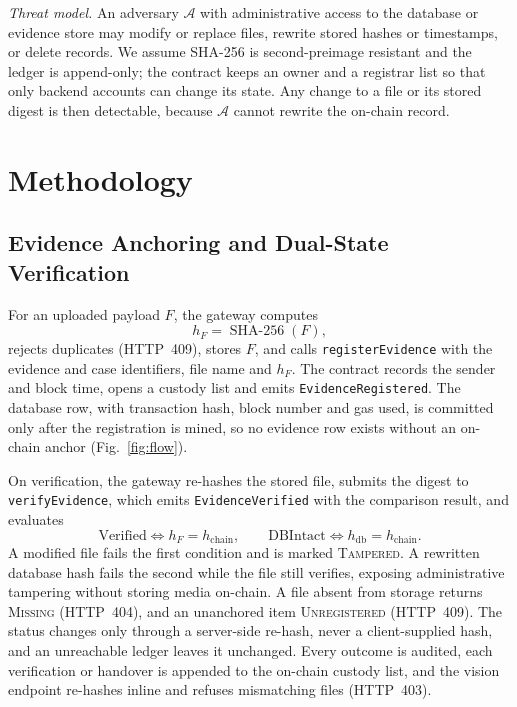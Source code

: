 \documentclass[conference]{IEEEtran}
\begin{document}
\textit{Threat model.} An adversary $\mathcal{A}$ with administrative access to the database or evidence store may modify or replace files, rewrite stored hashes or timestamps, or delete records. We assume SHA-256 is second-preimage resistant and the ledger is append-only; the contract keeps an owner and a registrar list so that only backend accounts can change its state. Any change to a file or its stored digest is then detectable, because $\mathcal{A}$ cannot rewrite the on-chain record.

\section{Methodology}
\label{sec:method}

\subsection{Evidence Anchoring and Dual-State Verification}
\label{subsec:anchoring}

For an uploaded payload $F$, the gateway computes
\begin{equation}
h_F=\operatorname{SHA\text{-}256}(F),
\label{eq:sha}
\end{equation}
rejects duplicates (HTTP~409), stores $F$, and calls \texttt{registerEvidence} with the evidence and case identifiers, file name and $h_F$. The contract records the sender and block time, opens a custody list and emits \texttt{EvidenceRegistered}. The database row, with transaction hash, block number and gas used, is committed only after the registration is mined, so no evidence row exists without an on-chain anchor (Fig.~\ref{fig:flow}).

On verification, the gateway re-hashes the stored file, submits the digest to \texttt{verifyEvidence}, which emits \texttt{EvidenceVerified} with the comparison result, and evaluates
\begin{equation}
\text{Verified}\iff h_F=h_{\text{chain}},\qquad
\text{DBIntact}\iff h_{\text{db}}=h_{\text{chain}}.
\label{eq:dual}
\end{equation}
A modified file fails the first condition and is marked \textsc{Tampered}. A rewritten database hash fails the second while the file still verifies, exposing administrative tampering without storing media on-chain. A file absent from storage returns \textsc{Missing} (HTTP~404), and an unanchored item \textsc{Unregistered} (HTTP~409). The status changes only through a server-side re-hash, never a client-supplied hash, and an unreachable ledger leaves it unchanged. Every outcome is audited, each verification or handover is appended to the on-chain custody list, and the vision endpoint re-hashes inline and refuses mismatching files (HTTP~403).
\end{document}
